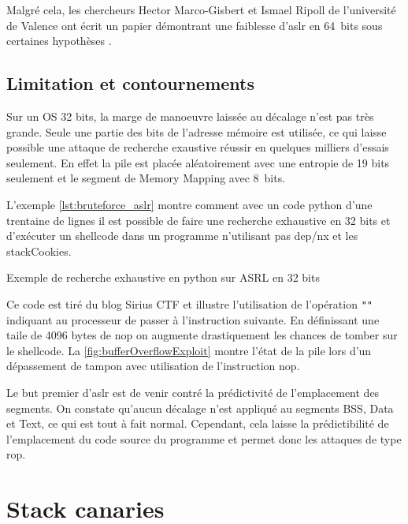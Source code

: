 Malgré cela, les chercheurs Hector Marco-Gisbert et Ismael Ripoll de l'université de Valence ont écrit un papier démontrant une faiblesse d'\gls{aslr} en 64~bits sous certaines hypothèses \cite{EffectivenessFullASLR64bit}.

\subsection{Limitation et contournements}

Sur un OS 32 bits, la marge de manoeuvre laissée au décalage n'est pas très grande. Seule une partie des bits de l'adresse mémoire est utilisée, ce qui laisse possible une attaque de recherche exaustive réussir en quelques milliers d'essais seulement. En effet la pile est placée aléatoirement avec une entropie de 19 bits seulement et le segment de Memory Mapping avec 8~bits.

L'exemple \autoref{lst:bruteforce_aslr} montre comment avec un code python d'une trentaine de lignes il est possible de faire une recherche exhaustive en 32 bits et d'exécuter un shellcode dans un programme n'utilisant pas \gls{dep}/\gls{nx} et les \gls{stackCookies}.

\begin{listing}
	\caption{Exemple de recherche exhaustive en python sur ASRL en 32 bits}
	\label{lst:bruteforce_aslr}
\end{listing}

Ce code est tiré du blog Sirius CTF \cite{ExploitingSimpleBufferOverflow} et illustre l'utilisation de l'opération \texttt{""} indiquant au processeur de passer à l'instruction suivante. En définissant une taile de 4096 bytes de \gls{nop} on augmente drastiquement les chances de tomber sur le shellcode. La \autoref{fig:bufferOverflowExploit} montre l'état de la pile lors d'un dépassement de tampon avec utilisation de l'instruction \gls{nop}.

Le but premier d'\gls{aslr} est de venir contré la prédictivité de l'emplacement des segments. On constate qu'aucun décalage n'est appliqué au segments BSS, Data et Text, ce qui est tout à fait normal. Cependant, cela laisse la prédictibilité de l'emplacement du code source du programme et permet donc les attaques de type \gls{rop}.

\vfill

\section{Stack canaries}

